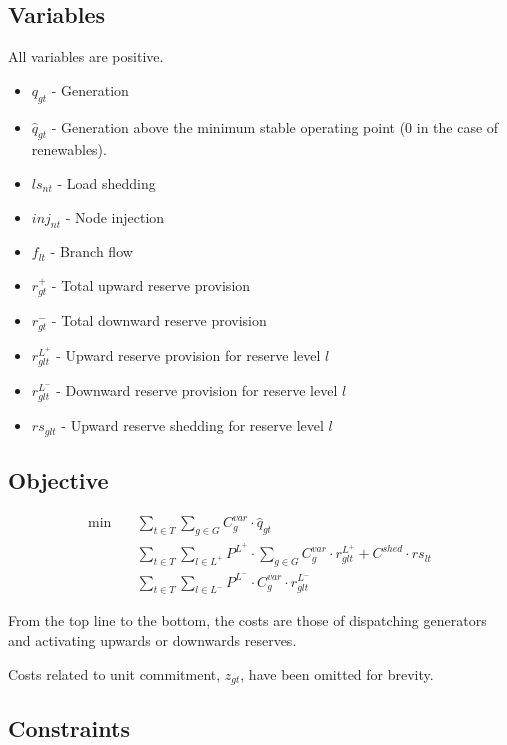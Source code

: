 \documentclass[number,times]{elsarticle}
\begin{document}
\subsection{Variables}

All variables are positive.

\begin{itemize}
    \item $q_{gt}$ - Generation
    \item $\hat{q}_{gt}$ - Generation above the minimum stable operating point (0 in the case of renewables).
    \item $ls_{nt}$ - Load shedding
    \item $inj_{nt}$ - Node injection
    \item $f_{lt}$ - Branch flow
    \item $r^+_{gt}$ - Total upward reserve provision
    \item $r^-_{gt}$ - Total downward reserve provision
    \item $r^{L^+}_{glt}$ - Upward reserve provision for reserve level $l$
    \item $r^{L^-}_{glt}$ - Downward reserve provision for reserve level $l$
    \item $rs_{glt}$ - Upward reserve shedding for reserve level $l$
\end{itemize}

\subsection{Objective}

\begin{align}
    \min \quad & \sum_{t \in T} \sum_{g \in G} C^{var}_{g} \cdot \hat{q}_{gt} \nonumber                                          \\
               & \sum_{t \in T} \sum_{l \in L^+} P^{L^+} \cdot \sum_{g \in G} C^{var}_{g} \cdot r^{L^+}_{glt} + C^{shed} \cdot rs_{lt} \\
               & \sum_{t \in T} \sum_{l \in L^-} P^{L^-} \cdot C^{var}_{g} \cdot r^{L^-}_{glt} \nonumber
\end{align}

From the top line to the bottom, the costs are those of dispatching generators and activating upwards or downwards reserves.

Costs related to unit commitment, $z_{gt}$, have been omitted for brevity.

\subsection{Constraints}
\end{document}
